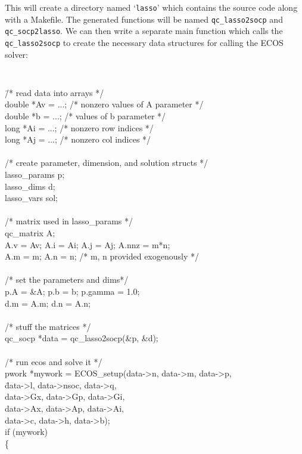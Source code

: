 \documentclass[11pt]{article}
\begin{document}
This will create a directory named `{\tt lasso}' which contains the source code
along with a Makefile. The
generated functions will be named {\tt qc\_lasso2socp} and {\tt qc\_socp2lasso}.
We can then write a separate main function which calls the {\tt qc\_lasso2socp}
to create the necessary data structures for calling the ECOS solver:
{\tt
\begin{tabbing}
\qquad \= /* read data into arrays */ \\
\> double *Av = ...; /* nonzero values of A parameter */\\
\> double *b = ...;  /* values of b parameter */\\
\> long *Ai = ...;   /* nonzero row indices */\\
\> long *Aj = ...;   /* nonzero col indices */\\
\\
\> /* create parameter, dimension, and solution structs */\\
\> lasso\_params p;\\
\> lasso\_dims d;\\
\> lasso\_vars sol;\\
\\
\> /* matrix used in lasso\_params */\\
\> qc\_matrix A;\\
\> A.v = Av; A.i = Ai; A.j = Aj; A.nnz = m*n;\\
\> A.m = m; A.n = n; /* m, n provided exogenously */ \\
\\
\> /* set the parameters and dims*/\\
\> p.A = \&A; p.b = b; p.gamma = 1.0;\\
\> d.m = A.m; d.n = A.n;\\
\\
\> /* stuff the matrices */\\
\> qc\_socp *data = qc\_lasso2socp(\&p, \&d);\\
\\
\> /* run ecos and solve it */\\
\> pwork *mywork = ECOS\_setup(data->n, data->m, data->p,\\
\> \quad \= data->l, data->nsoc, data->q,\\
\> \> data->Gx, data->Gp, data->Gi,\\
\> \> data->Ax, data->Ap, data->Ai,\\
\> \> data->c, data->h, data->b);\\
\> if (mywork)\\
\> \{\\

\end{tabbing}}
\end{document}
